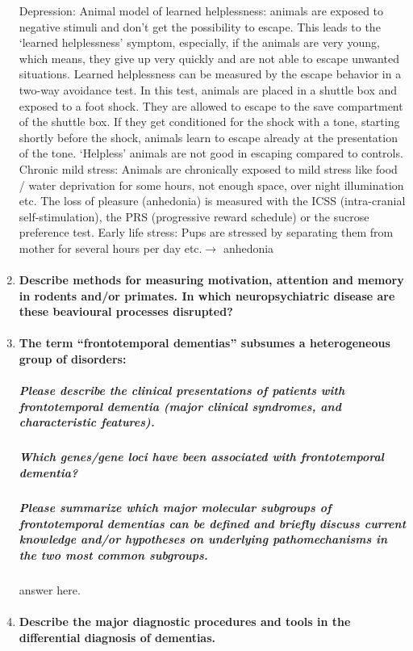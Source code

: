 \documentclass[12pt,article,oneside,a4paper]{memoir}
\begin{document}
\begin{enumerate}
	Depression:
	Animal model of learned helplessness: animals are exposed to negative stimuli and don’t get the possibility to escape. This leads to the ‘learned helplessness’ symptom, especially, if the animals are very young, which means, they give up very quickly and are not able to escape unwanted situations. Learned helplessness can be measured by the escape behavior in a two-way avoidance test. In this test, animals are placed in a shuttle box and exposed to a foot shock. They are allowed to escape to the save compartment of the shuttle box. If they get conditioned for the shock with a tone, starting shortly before the shock, animals learn to escape already at the presentation of the tone. ‘Helpless’ animals are not good in escaping compared to controls.
	Chronic mild stress: Animals are chronically exposed to mild stress like food / water deprivation for some hours, not enough space, over night illumination etc. The loss of pleasure (anhedonia) is measured with the ICSS (intra-cranial self-stimulation), the PRS (progressive reward schedule) or the sucrose preference test.
	Early life stress: Pups are stressed by separating them from mother for several hours per day etc.$\rightarrow$ anhedonia

\item \paragraph{Describe methods for measuring motivation, attention and memory in rodents and/or primates. In which neuropsychiatric disease are these beavioural processes disrupted?}

\item \paragraph{The term ``frontotemporal dementias'' subsumes a heterogeneous group of disorders:}
\subparagraph{Please describe the clinical presentations of patients with frontotemporal dementia (major clinical syndromes, and characteristic features).}
\subparagraph{Which genes/gene loci have been associated with frontotemporal dementia?}
\subparagraph{Please summarize which major molecular subgroups of frontotemporal dementias can be defined and briefly discuss current knowledge and/or hypotheses on underlying pathomechanisms in the two most common subgroups.} answer here.

\item \paragraph{Describe the major diagnostic procedures and tools in the differential diagnosis of dementias.}
\end{enumerate}
\end{document}
